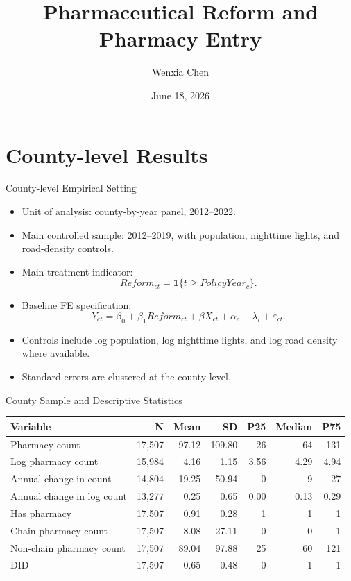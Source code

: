\documentclass{beamer}
\title{Pharmaceutical Reform and Pharmacy Entry}
\subtitle{}
\author{Wenxia Chen}
\date{June 18, 2026}
\begin{document}
\frame{\titlepage}


\section{County-level Results}

\begin{frame}{County-level Empirical Setting}

\small
\begin{itemize}\setlength\itemsep{0.65em}
    \item Unit of analysis: county-by-year panel, 2012--2022.
    \item Main controlled sample: 2012--2019, with population, nighttime lights, and road-density controls.
    \item Main treatment indicator:
    \[
        Reform_{ct}=\mathbf{1}\{t\geq PolicyYear_c\}.
    \]
    \item Baseline FE specification:
    \[
        Y_{ct}=\beta_0+\beta_1 Reform_{ct}+\beta X_{ct}+\alpha_c+\lambda_t+\varepsilon_{ct}.
    \]
    \item Controls include log population, log nighttime lights, and log road density where available.
    \item Standard errors are clustered at the county level.
\end{itemize}

\end{frame}

\begin{frame}{County Sample and Descriptive Statistics}

\centering
\scriptsize
\setlength{\tabcolsep}{4.5pt}

\begin{tabular}{lrrrrrr}
\toprule
Variable & N & Mean & SD & P25 & Median & P75 \\
\midrule
Pharmacy count & 17,507 & 97.12 & 109.80 & 26 & 64 & 131 \\
Log pharmacy count & 15,984 & 4.16 & 1.15 & 3.56 & 4.29 & 4.94 \\
Annual change in count & 14,804 & 19.25 & 50.94 & 0 & 9 & 27 \\
Annual change in log count & 13,277 & 0.25 & 0.65 & 0.00 & 0.13 & 0.29 \\
Has pharmacy & 17,507 & 0.91 & 0.28 & 1 & 1 & 1 \\
Chain pharmacy count & 17,507 & 8.08 & 27.11 & 0 & 0 & 1 \\
Non-chain pharmacy count & 17,507 & 89.04 & 97.88 & 25 & 60 & 121 \\
DID & 17,507 & 0.65 & 0.48 & 0 & 1 & 1 \\
\bottomrule
\end{tabular}


\end{frame}
\end{document}
